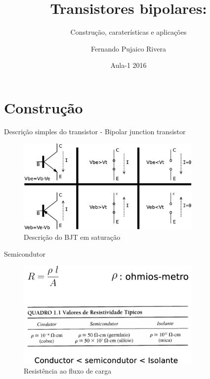 \documentclass[envcountsect,dvips]{beamer}
\begin{document}
\title[Transistores bipolares:   ] %
{Transistores bipolares:}
\subtitle{Construção, caraterísticas e aplicações}
\author[Fernando] %
{Fernando Pujaico Rivera}
\date[2016] %
{Aula-1 2016}
\subject{Computer Science}
\frame{\titlepage}

\section{Construção}


\begin{frame}{Descrição simples do transistor - Bipolar junction transistor \cite{boylestaddispositivos} }
\begin{figure}
\centering
\includegraphics[width=9cm]{images/simple.eps}
\caption{Descrição  do BJT em saturação}
\label{fig:simples}
\end{figure}
\end{frame}


\begin{frame}{Semicondutor  }
\begin{figure}
\centering
\includegraphics[width=9cm]{images/conductor.eps}
\caption{Resistência ao fluxo de carga}
\label{fig:conductor}
\end{figure}
\end{frame}
\end{document}
